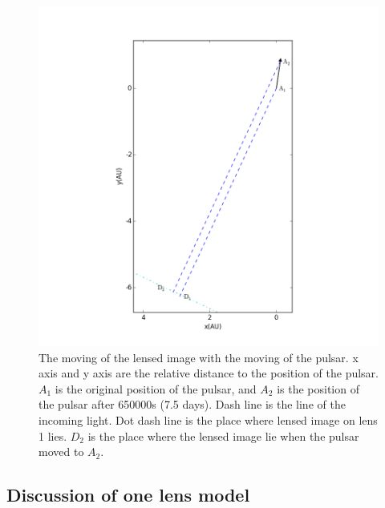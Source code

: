 \documentclass[useAMS,usenatbib]{mn2e}
\begin{document}
\begin{figure}
\centering
\includegraphics[width=1.0\linewidth, angle=0]{One_lens_reflection.png}
\caption{The moving of the lensed image with the moving of the pulsar. x axis and y axis are the relative distance to the position of the pulsar. $A_1$ is the original position of the pulsar, and $A_2$ is the position of the pulsar after 650000s (7.5 days). Dash line is the line of the incoming light. Dot dash line is the place where lensed image on lens 1 lies. $D_2$ is the place where the lensed image lie when the pulsar moved to $A_2$.}
\label{OneLensReflect}
\end{figure}



\subsection{Discussion of one lens model}
\end{document}
